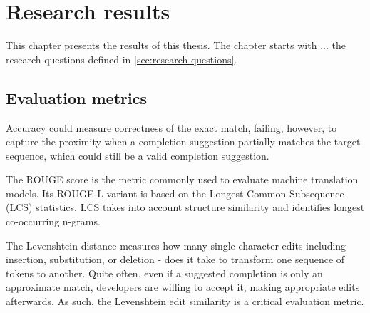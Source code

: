 \chapter{Research results}
\label{chap:results}
This chapter presents the results of this thesis. The chapter starts with ... the research questions defined in \cref{sec:research-questions}.

\section{Evaluation metrics}
Accuracy could measure correctness of the exact match, failing, however, to capture the proximity when a completion suggestion partially matches the target sequence, which could still be a valid completion suggestion.

The ROUGE score is the metric commonly used to evaluate machine translation models. Its ROUGE-L variant is based on the Longest Common Subsequence (LCS) statistics. LCS takes into account structure similarity and identifies longest co-occurring n-grams.

The Levenshtein distance measures how many single-character edits  including insertion, substitution, or deletion - does it take to transform one sequence of tokens to another. Quite often, even if a suggested completion is only an approximate match, developers are willing to accept it, making appropriate edits afterwards. As such, the Levenshtein edit similarity is a critical evaluation metric.